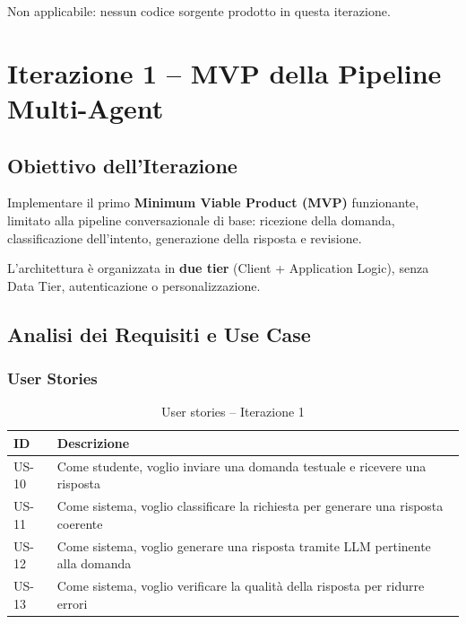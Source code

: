 \documentclass[a4paper,12pt]{report}
\begin{document}
Non applicabile: nessun codice sorgente prodotto in questa iterazione.


\chapter{Iterazione 1 -- MVP della Pipeline Multi-Agent}

\section{Obiettivo dell'Iterazione}

Implementare il primo \textbf{Minimum Viable Product (MVP)} funzionante, limitato alla pipeline conversazionale di base: ricezione della domanda, classificazione dell'intento, generazione della risposta e revisione.

L'architettura è organizzata in \textbf{due tier} (Client + Application Logic), senza Data Tier, autenticazione o personalizzazione.

\section{Analisi dei Requisiti e Use Case}

\subsection{User Stories}

\begin{table}[H]
\centering
\begin{tabularx}{\textwidth}{l X}
\toprule
\textbf{ID} & \textbf{Descrizione} \\
\midrule
US-10 & Come studente, voglio inviare una domanda testuale e ricevere una risposta \\
US-11 & Come sistema, voglio classificare la richiesta per generare una risposta coerente \\
US-12 & Come sistema, voglio generare una risposta tramite LLM pertinente alla domanda \\
US-13 & Come sistema, voglio verificare la qualità della risposta per ridurre errori \\
\bottomrule
\end{tabularx}
\caption{User stories -- Iterazione 1}
\end{table}
\end{document}
